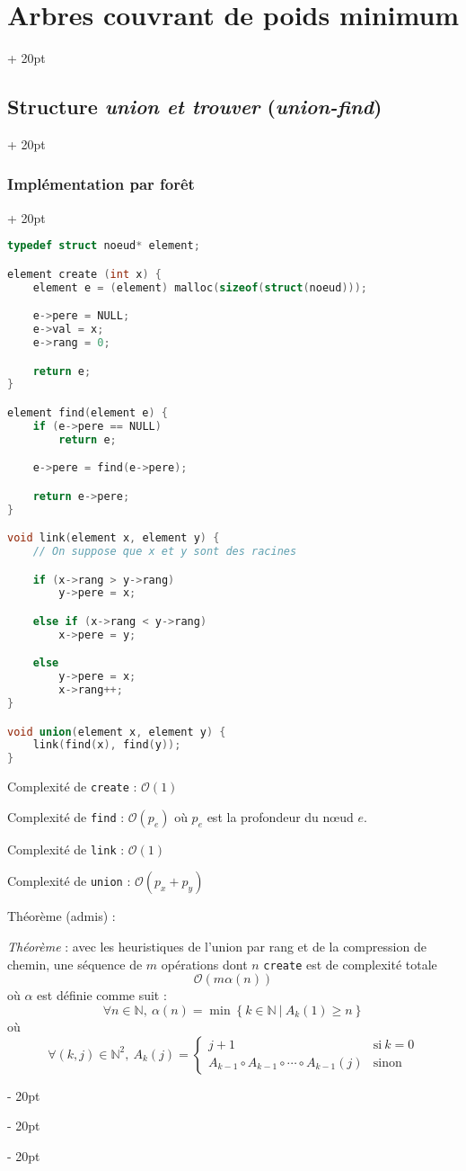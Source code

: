 \documentclass[a4paper, 12pt, twoside]{article}
\newcommand{\N}{\mathbb{N}} %
\newcommand{\set}[1]{\left\{ #1 \right\}}
\renewcommand{\ge}{\geqslant}
\newcommand{\ind}[1][20pt]{\advance\leftskip + #1}
\newcommand{\deind}[1][20pt]{\advance\leftskip - #1}
\newenvironment{indt}[2][20pt]{#2 \par \ind[#1]}{\par \deind} %
\begin{document}
\begin{indt}{\section{Arbres couvrant de poids minimum}}
\begin{indt}{\subsection{Structure \textit{union et trouver} (\textit{union-find})}}
\begin{indt}{\subsubsection{Implémentation par forêt}}
\begin{lstlisting}[language=C, xleftmargin=80pt]
typedef struct noeud* element;

element create (int x) {
    element e = (element) malloc(sizeof(struct(noeud)));

    e->pere = NULL;
    e->val = x;
    e->rang = 0;

    return e;
}

element find(element e) {
    if (e->pere == NULL)
        return e;

    e->pere = find(e->pere);

    return e->pere;
}

void link(element x, element y) {
    // On suppose que x et y sont des racines

    if (x->rang > y->rang)
        y->pere = x;

    else if (x->rang < y->rang)
        x->pere = y;

    else
        y->pere = x;
        x->rang++;
}

void union(element x, element y) {
    link(find(x), find(y));
}\end{lstlisting}

                Complexité de \texttt{create} : $\mathcal O(1)$

                Complexité de \texttt{find} : $\mathcal O(p_e)$ où $p_e$ est la profondeur du n\oe ud $e$.

                Complexité de \texttt{link} : $\mathcal O(1)$

                Complexité de \texttt{union} : $\mathcal O(p_x + p_y)$

                \vspace{12pt}
                
                Théorème (admis) :
                \begin{pseudocode}
                    \textit{Théorème} :
                    avec les heuristiques de l'union par rang et de la compression de chemin, une séquence de $m$ opérations dont $n$ \texttt{create} est de complexité totale
                    \[
                        \mathcal O(m \alpha(n))
                    \]
                    où $\alpha$ est définie comme suit :
                    \[
                        \forall n \in \N,\
                        \alpha(n) = \min\set{k \in \N\ |\ A_k(1) \ge n}
                    \]
                    où
                    \[
                        \forall (k, j) \in \N^2,\
                        A_k(j) =
                        \begin{cases}
                            j + 1 & \text{si}\ k = 0
                            \\
                            A_{k - 1} \circ A_{k - 1} \circ \cdots \circ A_{k - 1}(j)
                                  & \text{sinon}
                        \end{cases}
                    \]
                \end{pseudocode}


\end{indt}
\end{indt}
\end{indt}
\end{document}
